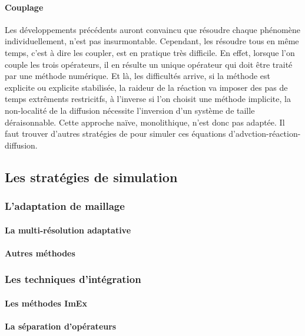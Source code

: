     \paragraph{Couplage}
        Les développements précédents auront convaincu que résoudre chaque phénomène individuellement, n'est pas insurmontable. 
        Cependant, les résoudre tous en même temps, c'est à dire les coupler, est en pratique très difficile.
        En effet, lorsque l'on couple les trois opérateurs, il en résulte un unique opérateur qui doit être traité par une méthode numérique.
        Et là, les difficultés arrive, si la méthode est explicite ou explicite stabilisée, la raideur de la réaction va imposer des pas de temps extrêments restricitfs,
        à l'inverse si l'on choisit une méthode implicite, la non-localité de la diffusion nécessite l'inversion d'un système de taille déraisonnable. 
        Cette approche naïve, monolithique, n'est donc pas adaptée. Il faut trouver d'autres stratégies de pour simuler ces équations d'advction-réaction-diffusion.

\subsection{Les stratégies de simulation}
\subsubsection{L'adaptation de maillage}
    \paragraph{La multi-résolution adaptative}
    \paragraph{Autres méthodes}
\subsubsection{Les techniques d'intégration}
    \paragraph{Les méthodes ImEx}
    \paragraph{La séparation d'opérateurs}
